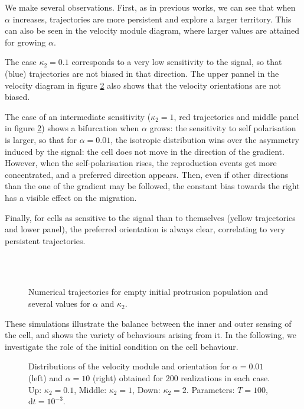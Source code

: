 \documentclass[a4paper,11pt]{article}
\newcommand{\dx}{\textrm{d}}
\begin{document}
We make several observations. First, as in previous works, we can see that when $\alpha$ increases, trajectories are more persistent and explore a larger territory. This can also be seen in the velocity module diagram, where larger values are attained for growing $\alpha$.\par 
 The case $\kappa_2=0.1$ corresponds to a very low sensitivity to the signal, so that (blue) trajectories are not biased in that direction. The upper pannel in the velocity diagram in figure \ref{fig:noCI_distrib} also shows that the velocity orientations are not biased.\par 
 The case of an intermediate sensitivity ($\kappa_2=1$, red trajectories and middle panel in figure \ref{fig:noCI_distrib}) shows a bifurcation when $\alpha$ grows: the sensitivity to self polarisation is larger, so that for $\alpha=0.01$, the isotropic distribution wins over the asymmetry induced by the signal: the cell does not move in the direction of the gradient. However, when the self-polarisation rises, the reproduction events get more concentrated, and a preferred direction appears. Then, even if other directions than the one of the gradient may be followed, the constant bias towards the right has a visible effect on the migration. \par 
Finally, for cells as sensitive to the signal than to themselves (yellow trajectories and lower panel), the preferred orientation is always clear, correlating to very persistent trajectories. 

\begin{figure}[H]
	\centering
	\quad
	\\	
		\quad
	\\	
	\caption{Numerical trajectories for empty initial protrusion population and several values for $\alpha$ and $\kappa_2$.}\label{fig:noCI}
\end{figure}

These simulations illustrate the balance between the inner and outer sensing of the cell, and shows the variety of behaviours arising from it. In the following, we investigate the role of the initial condition on the cell behaviour. 


\begin{figure}[H]
\centering
{}\quad
{}
\caption{Distributions of the velocity module and orientation for $\alpha=0.01$ (left) and $\alpha=10$ (right) obtained for 200 realizations in each case. Up: $\kappa_2=0.1$, Middle: $\kappa_2=1$, Down: $\kappa_2=2$. Parameters: $T=100$, $\dx t = 10^{-3}$.}\label{fig:noCI_distrib}
\end{figure}
\end{document}
